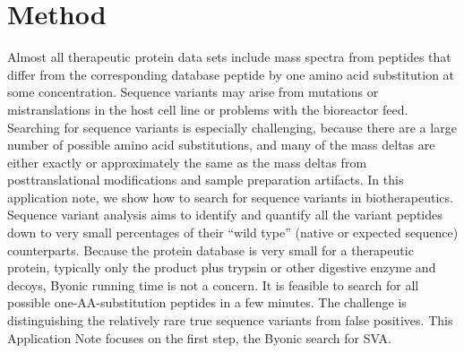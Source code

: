 \documentclass[letterpaper,10pt,oneside,english]{sphinxmanual}
\begin{document}
\section{Method}
\label{\detokenize{applicationnote:method}}
Almost all therapeutic protein data sets include mass spectra from peptides that differ from the corresponding database peptide by one amino acid substitution at some concentration.  Sequence variants may arise from mutations or mistranslations in the host cell line or problems with the bioreactor feed.  Searching for sequence variants is especially challenging, because there are a large number of possible amino acid substitutions, and many of the mass deltas are either exactly or approximately the same as the mass deltas from posttranslational modifications and sample preparation artifacts.  In this application note, we show how to search for sequence variants in biotherapeutics.
Sequence variant analysis aims to identify and quantify all the variant peptides down to very small percentages of their “wild type” (native or expected sequence) counterparts.  Because the protein database is very small for a therapeutic protein, typically only the product plus trypsin or other digestive enzyme and decoys, Byonic running time is not a concern. It is feasible to search for all possible one-AA-substitution peptides in a few minutes.  The challenge is distinguishing the relatively rare true sequence variants from false positives.
This Application Note focuses on the first step, the Byonic search for SVA.
\end{document}
